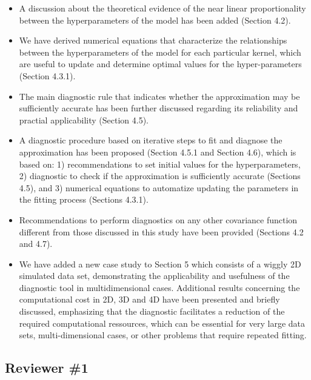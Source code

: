 \documentclass[11pt]{report}
\begin{document}
\begin{itemize}

\item A discussion about the theoretical evidence of the near linear proportionality between the hyperparameters of the model has been added (Section 4.2). 

\item We have derived numerical equations that characterize the relationships between the hyperparameters of the model for each particular kernel, which are useful to update and determine optimal values for the hyper-parameters (Section 4.3.1). 

\item The main diagnostic rule that indicates whether the approximation may be sufficiently accurate has been further discussed regarding its reliability and practial applicability (Section 4.5).

\item A diagnostic procedure based on iterative steps to fit and diagnose the approximation has been proposed (Section 4.5.1 and Section 4.6), which is based on: 1) recommendations to set initial values for the hyperparameters, 2) diagnostic to check if the approximation is sufficiently accurate (Sections 4.5), and 3) numerical equations to automatize updating the parameters in the fitting process (Sections 4.3.1).

\item Recommendations to perform diagnostics on any other covariance function different from those discussed in this study have been provided (Sections 4.2 and 4.7).

\item We have added a new case study to Section 5 which consists of a wiggly 2D simulated data set, demonstrating the applicability and usefulness of the diagnostic tool in multidimensional cases. Additional results concerning the computational cost in 2D, 3D and 4D have been presented and briefly discussed, emphasizing that the diagnostic facilitates a reduction of the required computational ressources, which can be essential for very large data sets, multi-dimensional cases, or other problems that require repeated fitting.

\end{itemize}

\noindent \hdashrule{12.5cm}{0.2pt}{2mm 1pt}

\subsection*{Reviewer \#1}
\end{document}
